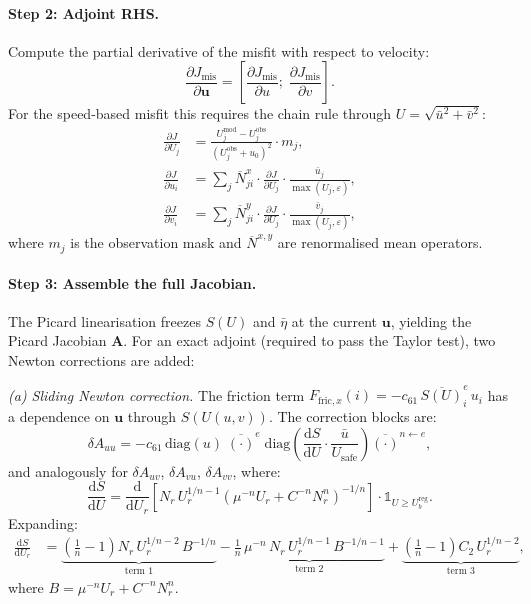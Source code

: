 \documentclass[a4paper,11pt,fleqn]{article}
\newcommand{\ve}[1]{\boldsymbol{#1}}
\newcommand{\be}{\begin{equation}}
\newcommand{\ee}{\end{equation}}
\newcommand{\pd}[2]{\frac{\partial #1}{\partial #2}}
\newcommand{\eps}{\varepsilon}
\newcommand{\dd}{\mathrm{d}}
\begin{document}
\paragraph{Step 2: Adjoint RHS.}
Compute the partial derivative of the misfit with respect to velocity:
\be
\pd{J_{\mathrm{mis}}}{\ve{u}} = \left[\pd{J_{\mathrm{mis}}}{u};\; \pd{J_{\mathrm{mis}}}{v}\right].
\ee
For the speed-based misfit this requires the chain rule through $U = \sqrt{\bar u^2 + \bar v^2}$:
\begin{align}
    \pd{J}{U_j} &= \frac{U_j^{\mathrm{mod}} - U_j^{\mathrm{obs}}}{(U_j^{\mathrm{obs}} + u_0)^2} \cdot m_j, \\
    \pd{J}{u_i} &= \sum_j \overline{N}_{ji}^x \cdot \pd{J}{U_j} \cdot \frac{\bar u_j}{\max(U_j,\eps)}, \\
    \pd{J}{v_i} &= \sum_j \overline{N}_{ji}^y \cdot \pd{J}{U_j} \cdot \frac{\bar v_j}{\max(U_j,\eps)},
\end{align}
where $m_j$ is the observation mask and $\overline{N}^{x,y}$ are renormalised mean operators.

\paragraph{Step 3: Assemble the full Jacobian.}
The Picard linearisation freezes $S(U)$ and $\bar\eta$ at the current $\ve{u}$, yielding the Picard Jacobian $\mathbf{A}$. For an exact adjoint (required to pass the Taylor test), two Newton corrections are added:

\medskip
\noindent\textit{(a) Sliding Newton correction.} The friction term $F_{\mathrm{fric},x}(i) = -c_{61}\,\overline{S(U)}^e_i\, u_i$ has a dependence on $\ve{u}$ through $S(U(u,v))$. The correction blocks are:
\be
\delta A_{uu} = -c_{61}\,\mathrm{diag}(u)\;\overline{(\cdot)}^{e}\;\mathrm{diag}\!\left(\frac{\dd S}{\dd U}\cdot\frac{\bar u}{U_{\mathrm{safe}}}\right)\overline{(\cdot)}^{n \leftarrow e},
\ee
and analogously for $\delta A_{uv}$, $\delta A_{vu}$, $\delta A_{vv}$, where:
\be
\frac{\dd S}{\dd U} = \frac{\dd}{\dd U_r}\left[N_r\, U_r^{1/n-1}\left(\mu^{-n}U_r + C^{-n}N_r^n\right)^{-1/n}\right] \cdot \mathbb{1}_{U \geq U_b^{\mathrm{reg}}}.
\ee
Expanding:
\begin{align}
    \frac{\dd S}{\dd U_r} &= \underbrace{\left(\frac{1}{n}-1\right) N_r\, U_r^{1/n-2}\, B^{-1/n}}_{\text{term 1}} - \underbrace{\frac{1}{n}\,\mu^{-n}\, N_r\, U_r^{1/n-1}\, B^{-1/n-1}}_{\text{term 2}} + \underbrace{\left(\frac{1}{n}-1\right) C_2\, U_r^{1/n-2}}_{\text{term 3}},
\end{align}
where $B = \mu^{-n}U_r + C^{-n}N_r^n$.
\end{document}
